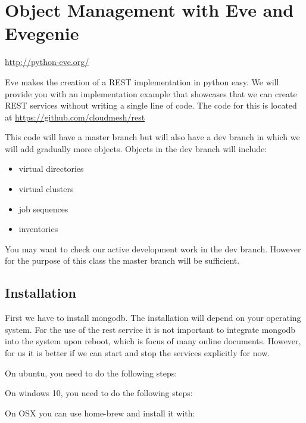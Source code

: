 \section{Object Management with Eve and Evegenie}

\url{http://python-eve.org/}

Eve makes the creation of a REST implementation in python easy.  We
will provide you with an implementation example that showcases that we
can create REST services without writing a single line of code. The
code for this is located at \url{https://github.com/cloudmesh/rest}

This code will have a master branch but will also have a dev branch in
which we will add gradually more objects. Objects in the dev branch will
include:

\begin{itemize}
\item
 virtual directories
\item
 virtual clusters
\item
 job sequences
\item
 inventories
\end{itemize}

You may want to check our active development work in the dev branch.
However for the purpose of this class the master branch will be
sufficient.

\subsection{Installation}\label{installation}

First we have to install mongodb. The installation will depend on your
operating system. For the use of the rest service it is not important to
integrate mongodb into the system upon reboot, which is focus of many
online documents. However, for us it is better if we can start and stop
the services explicitly for now.

On ubuntu, you need to do the following steps:


On windows 10, you need to do the following steps:


On OSX you can use home-brew and install it with:

